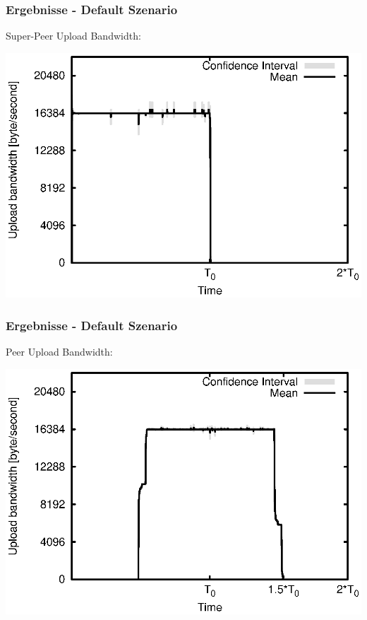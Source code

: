 \begin{frame}
  \frametitle{Ergebnisse - Default Szenario}
  Super-Peer Upload Bandwidth:
  
  \begin{center}
    \includegraphics[width=1\textwidth]{fig/plots/scenario_1_default/plots/GeneratedMeanCurrentSuperSeederUploadBandwidth.csv.eps}
  \end{center}
\end{frame}


\begin{frame}
  \frametitle{Ergebnisse - Default Szenario}
  Peer Upload Bandwidth:
  
  \begin{center}
    \includegraphics[width=1\textwidth]{fig/plots/scenario_1_default/plots/GeneratedMeanCurrentUploadBandwidth.csv.eps}
  \end{center}
\end{frame}


